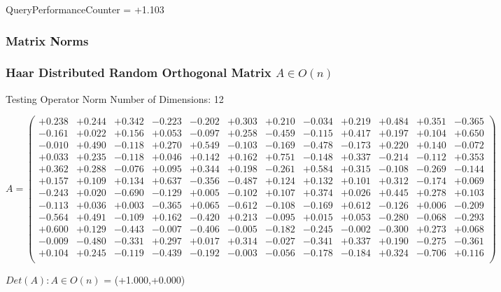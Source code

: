 \documentclass[9pt]{article}
\theoremstyle{plain}
\theoremstyle{definition}
\theoremstyle{remark}
\numberwithin{equation}{section}
\begin{document}
QueryPerformanceCounter  =  +1.103
\subsubsection{Matrix Norms}
\subsubsection{Haar Distributed Random Orthogonal Matrix $A \in O(n)$}
 Testing Operator Norm
Number of Dimensions: 12

$A = \left(
\begin{array}{
cccccccccccc}
+0.238 & +0.244 & +0.342 & -0.223 & -0.202 & +0.303 & +0.210 & -0.034 & +0.219 & +0.484 & +0.351 & -0.365 \\
-0.161 & +0.022 & +0.156 & +0.053 & -0.097 & +0.258 & -0.459 & -0.115 & +0.417 & +0.197 & +0.104 & +0.650 \\
-0.010 & +0.490 & -0.118 & +0.270 & +0.549 & -0.103 & -0.169 & -0.478 & -0.173 & +0.220 & +0.140 & -0.072 \\
+0.033 & +0.235 & -0.118 & +0.046 & +0.142 & +0.162 & +0.751 & -0.148 & +0.337 & -0.214 & -0.112 & +0.353 \\
+0.362 & +0.288 & -0.076 & +0.095 & +0.344 & +0.198 & -0.261 & +0.584 & +0.315 & -0.108 & -0.269 & -0.144 \\
+0.157 & +0.109 & +0.134 & +0.637 & -0.356 & -0.487 & +0.124 & +0.132 & +0.101 & +0.312 & -0.174 & +0.069 \\
-0.243 & +0.020 & -0.690 & -0.129 & +0.005 & -0.102 & +0.107 & +0.374 & +0.026 & +0.445 & +0.278 & +0.103 \\
-0.113 & +0.036 & +0.003 & -0.365 & +0.065 & -0.612 & -0.108 & -0.169 & +0.612 & -0.126 & +0.006 & -0.209 \\
-0.564 & +0.491 & -0.109 & +0.162 & -0.420 & +0.213 & -0.095 & +0.015 & +0.053 & -0.280 & -0.068 & -0.293 \\
+0.600 & +0.129 & -0.443 & -0.007 & -0.406 & -0.005 & -0.182 & -0.245 & -0.002 & -0.300 & +0.273 & +0.068 \\
-0.009 & -0.480 & -0.331 & +0.297 & +0.017 & +0.314 & -0.027 & -0.341 & +0.337 & +0.190 & -0.275 & -0.361 \\
+0.104 & +0.245 & -0.119 & -0.439 & -0.192 & -0.003 & -0.056 & -0.178 & -0.184 & +0.324 & -0.706 & +0.116 \\
\end{array}
\right)$ \newline 

$Det(A) :   A \in O(n)$ = (+1.000,+0.000)
\end{document}

